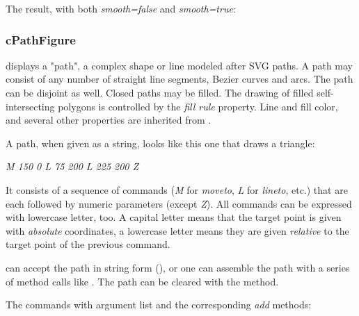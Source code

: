 
The result, with both \textit{smooth=false} and \textit{smooth=true}:

\begin{center}

\end{center}


\subsubsection{cPathFigure}
\label{sec:graphics:pathfigure}

 displays a "path", a complex shape or line modeled after SVG
paths. A path may consist of any number of straight line segments, Bezier
curves and arcs. The path can be disjoint as well. Closed paths may be filled.
The drawing of filled self-intersecting polygons is controlled by the
\textit{fill rule} property. Line and fill color, and several other properties
are inherited from .

A path, when given as a string, looks like this one that draws a triangle:

\textit{M 150 0 L 75 200 L 225 200 Z}

It consists of a sequence of commands (\textit{M} for \textit{moveto},
\textit{L} for \textit{lineto}, etc.) that are each followed by numeric
parameters (except \textit{Z}). All commands can be expressed with
lowercase letter, too. A capital letter means that the target point is
given with \textit{absolute} coordinates, a lowercase letter means they are
given \textit{relative} to the target point of the previous command.

 can accept the path in string form (),
or one can assemble the path with a series of method calls like
. The path can be cleared with the 
method.

The commands with argument list and the corresponding \textit{add} methods:

